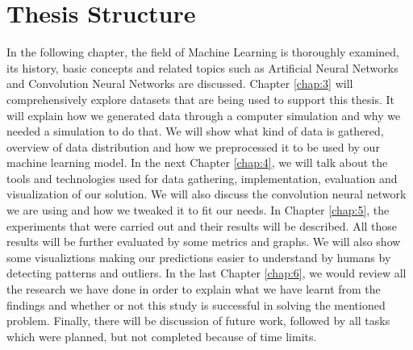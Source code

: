 \section{Thesis Structure}
In the following chapter, the field of Machine Learning is thoroughly examined, its history, basic concepts and related topics such as Artificial Neural Networks \cite{ann} and Convolution Neural Networks are discussed. Chapter \ref{chap:3} will comprehensively explore datasets that are being used to support this thesis. It will explain how we generated data through a computer simulation and why we needed a simulation to do that. We will show what kind of data is gathered, overview of data distribution and how we preprocessed it to be used by our machine learning model. In the next Chapter \ref{chap:4}, we will talk about the tools and technologies used for data gathering, implementation, evaluation and visualization of our solution. We will also discuss the convolution neural network we are using and how we tweaked it to fit our needs. In Chapter \ref{chap:5}, the experiments that were carried out and their results will be described. All those results will be further evaluated by some metrics and graphs. We will also show some visualiztions making our predictions easier to understand by humans by detecting patterns and outliers. In the last Chapter \ref{chap:6}, we would review all the research we have done in order to explain what we have learnt from the findings and whether or not this study is successful in solving the mentioned problem. Finally, there will be discussion of future work, followed by all tasks which were planned, but not completed because of time limits.